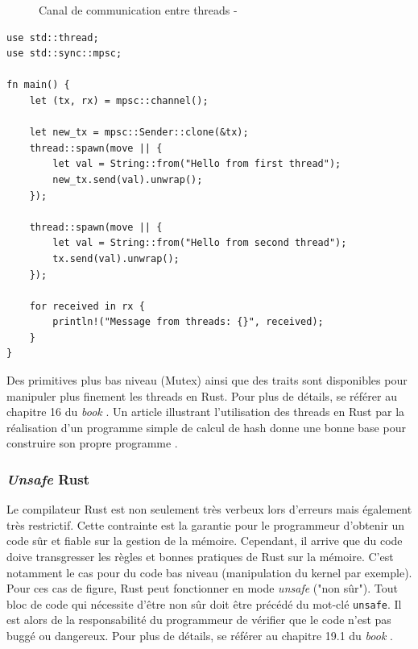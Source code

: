 \documentclass[a4paper, 12pt]{article}
\newenvironment{code}{\captionsetup{type=listing}}{}
\begin{document}
\begin{figure}
    \begin{center}
    \end{center}
    \caption{Canal de communication entre threads - \cite{ref37}}
    \label{rust_channel}
\end{figure}
\bigbreak
\begin{code}
    \begin{verbatim}
use std::thread;
use std::sync::mpsc;

fn main() {
    let (tx, rx) = mpsc::channel();

    let new_tx = mpsc::Sender::clone(&tx);
    thread::spawn(move || {
        let val = String::from("Hello from first thread");
        new_tx.send(val).unwrap();
    });

    thread::spawn(move || {
        let val = String::from("Hello from second thread");
        tx.send(val).unwrap();
    });

    for received in rx {
        println!("Message from threads: {}", received);
    }
}
    \end{verbatim}
    \caption{\textit{Message passing} avec deux producteurs et un consommateur en Rust}
    \label{rust_thread_message}
\end{code}
\bigbreak
Des primitives plus bas niveau (Mutex) ainsi que des traits sont disponibles pour manipuler 
plus finement les threads en Rust. Pour plus de détails, se référer au chapitre 16 du \textit{book} \cite{ref0}.
Un article illustrant l'utilisation des threads en Rust par la réalisation d'un programme simple 
de calcul de hash donne une bonne base pour construire son propre programme \cite{ref37}.

\subsubsection{\textit{Unsafe} Rust}
Le compilateur Rust est non seulement très verbeux lors d'erreurs mais également très restrictif. 
Cette contrainte est la garantie pour le programmeur d'obtenir un code sûr et fiable sur la gestion 
de la mémoire. Cependant, il arrive que du code doive transgresser les règles et bonnes pratiques
de Rust sur la mémoire. C'est notamment le cas pour du code bas niveau (manipulation du kernel par 
exemple). Pour ces cas de figure, Rust peut fonctionner en mode \textit{unsafe} ("non sûr"). Tout 
bloc de code qui nécessite d'être non sûr doit être précédé du mot-clé \texttt{unsafe}. 
Il est alors de la responsabilité du programmeur de vérifier que le code n'est pas buggé ou dangereux.
Pour plus de détails, se référer au chapitre 19.1 du \textit{book} \cite{ref0}.
\end{document}

